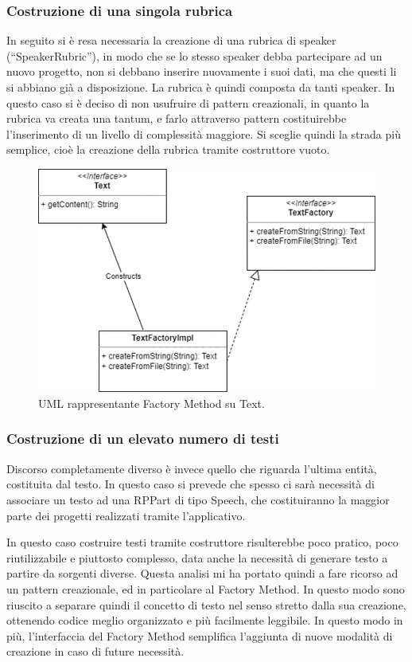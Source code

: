 \documentclass[a4paper,12pt]{report}
\begin{document}
\subsubsection{Costruzione di una singola rubrica}
In seguito si è resa necessaria la creazione di una rubrica di speaker (“SpeakerRubric”), in modo che se lo stesso speaker debba partecipare ad un nuovo progetto, non si debbano inserire nuovamente i suoi dati, ma che questi li si abbiano già a disposizione. La rubrica è quindi composta da tanti speaker. In questo caso si è deciso di non usufruire di pattern creazionali, in quanto la rubrica va creata una tantum, e farlo attraverso pattern costituirebbe l’inserimento di un livello di complessità maggiore. Si sceglie quindi la strada più semplice, cioè la creazione della rubrica tramite costruttore vuoto.
\endsubsubsection

\begin{figure}[h]
\centering{}
\includegraphics[width=\textwidth,scale=1]{img/text.png}
\caption{UML rappresentante Factory Method su Text.}
\end{figure}

\subsubsection{Costruzione di un elevato numero di testi}
Discorso completamente diverso è invece quello che riguarda l’ultima entità, costituita dal testo. In questo caso si prevede che spesso ci sarà necessità di associare un testo ad una RPPart di tipo Speech, che costituiranno la maggior parte dei progetti realizzati tramite l’applicativo. 

In questo caso costruire testi tramite costruttore risulterebbe poco pratico, poco riutilizzabile e piuttosto complesso, data anche la necessità di generare testo a partire da sorgenti diverse. Questa analisi mi ha portato quindi a fare ricorso ad un pattern creazionale, ed in particolare al Factory Method. In questo modo sono riuscito a separare quindi il concetto di testo nel senso stretto dalla sua creazione, ottenendo codice meglio organizzato e più facilmente leggibile. In questo modo in più, l’interfaccia del Factory Method semplifica l’aggiunta di nuove modalità di creazione in caso di future necessità. 
\end{document}
